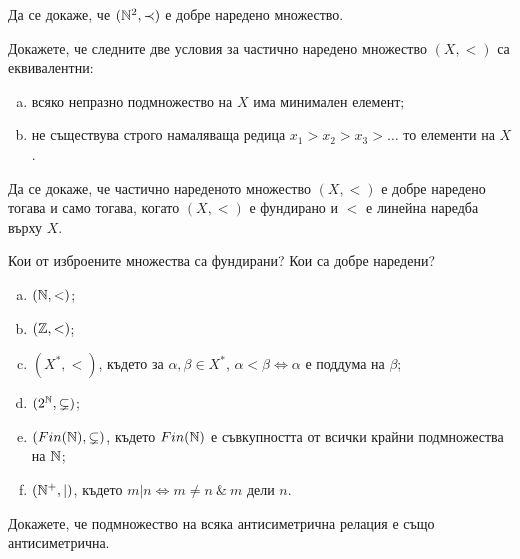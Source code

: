 \begin{problem}
  Да се докаже, че $(\mathbb{N}^2,\prec)$ е добре наредено множество.
\end{problem}

\begin{problem}
  Докажете, че следните две условия за частично наредено множество $(X,<)$ са еквивалентни:
  \begin{enumerate}[a)]
  \item
    всяко непразно подмножество на $X$ има минимален елемент;
  \item
    не съществува строго намаляваща редица $x_1>x_2>x_3>\dots$ то елементи на $X$.
  \end{enumerate}
\end{problem}

\begin{problem}
  Да се докаже, че частично нареденото множество $(X,<)$ е добре наредено тогава и само тогава, когато 
  $(X,<)$ е фундирано и $<$ е линейна наредба върху $X$.
\end{problem}

\begin{problem}%
  Кои от изброените множества са фундирани? Кои са добре наредени?
  \begin{enumerate}[a)]
  \item
    $(\mathbb{N},<)$;
  \item
    $(\mathbb{Z},<)$;
  \item
    $(X^*, <)$, където за $\alpha,\beta\in X^*$, $\alpha < \beta \iff \alpha\mbox{ е поддума на }\beta$;
  \item
    $(2^{\mathbb{N}},\subsetneq)$;
  \item
    $(Fin(\mathbb{N}),\subsetneq)$, където $Fin(\mathbb{N})$ е съвкупността от всички крайни подмножества на $\mathbb{N}$;
  \item
    $(\mathbb{N}^+,|)$, където $m|n \iff m\neq n\ \&\ m\mbox{ дели }n$.
  \end{enumerate}
\end{problem}

\begin{problem}
  Докажете, че подмножество на всяка антисиметрична релация е също антисиметрична.
\end{problem}





